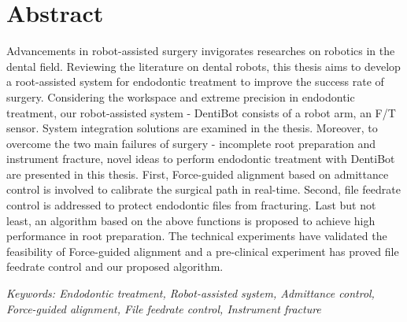 \chapter{Abstract}
\label{ch:abstract}
\vspace*{-10mm}
\hspace*{6mm}Advancements in robot-assisted surgery invigorates researches on robotics in the dental field. Reviewing the literature on dental robots, this thesis aims to develop a root-assisted system for endodontic treatment to improve the success rate of surgery. Considering the workspace and extreme precision in endodontic treatment, our robot-assisted system - DentiBot consists of a robot arm, an F/T sensor. System integration solutions are examined in the thesis. Moreover, to overcome the two main failures of surgery - incomplete root preparation and instrument fracture, novel ideas to perform endodontic treatment with DentiBot are presented in this thesis. First, Force-guided alignment based on admittance control is involved to calibrate the surgical path in real-time. Second, file feedrate control is addressed to protect endodontic files from fracturing. Last but not least, an algorithm based on the above functions is proposed to achieve high performance in root preparation. The technical experiments have validated the feasibility of Force-guided alignment and a pre-clinical experiment has proved file feedrate control and our proposed algorithm.




\textit{Keywords: Endodontic treatment, Robot-assisted system, Admittance control, Force-guided alignment, File feedrate control, Instrument fracture}

 



